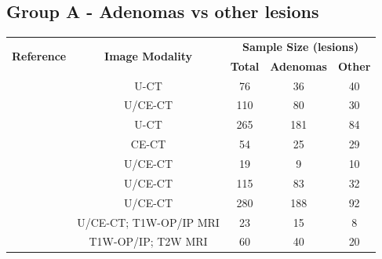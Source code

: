 \documentclass{article}
\begin{document}
\subsection{Group A - Adenomas vs other lesions}

\begin{table}[]
    \centering
    \begin{tabular}{ccccc}\toprule
        \multirow{2}{*}{\textbf{Reference}} & \multirow{2}{*}{\textbf{Image Modality}} & \multicolumn{3}{c}{\textbf{Sample Size (lesions)}}
        \\\cmidrule(lr){3-5}
                                            &                                          & \textbf{Total}                                     & \textbf{Adenomas} & \textbf{Other} \\\midrule
        \cite{Tu2018}                       & U-CT                                     & 76                                                 & 36                & 40             \\
        \cite{Yi20181}                      & U/CE-CT                                  & 110                                                & 80                & 30             \\
        \cite{Yi2018}                       & U-CT                                     & 265                                                & 181               & 84             \\
        \cite{Elmohr2019}                   & CE-CT                                    & 54                                                 & 25                & 29             \\
        \cite{Torresan2021}                 & U/CE-CT                                  & 19                                                 & 9                 & 10             \\
        \cite{Kusunoki2022}                 & U/CE-CT                                  & 115                                                & 83                & 32             \\
        \cite{Liu2022}                      & U/CE-CT                                  & 280                                                & 188               & 92             \\
        \cite{Ho2019}                       & U/CE-CT; T1W-OP/IP MRI                   & 23                                                 & 15                & 8              \\
        \cite{Liu2021}                      & T1W-OP/IP; T2W MRI                       & 60                                                 & 40                & 20             \\

\end{tabular}
\end{table}
\end{document}
